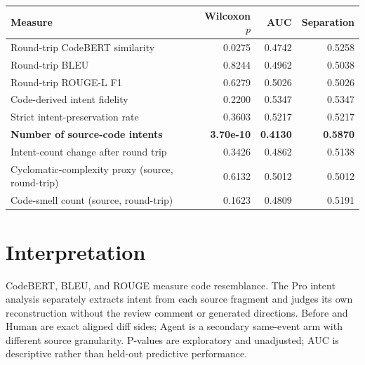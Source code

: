 \documentclass[11pt]{article}
\begin{document}
\begin{longtable}{p{8.5cm}rrr}
\toprule
Measure & Wilcoxon $p$ & AUC & Separation \\
\midrule
Round-trip CodeBERT similarity & 0.0275 & 0.4742 & 0.5258 \\
Round-trip BLEU & 0.8244 & 0.4962 & 0.5038 \\
Round-trip ROUGE-L F1 & 0.6279 & 0.5026 & 0.5026 \\
Code-derived intent fidelity & 0.2200 & 0.5347 & 0.5347 \\
Strict intent-preservation rate & 0.3603 & 0.5217 & 0.5217 \\
\textbf{Number of source-code intents} & \textbf{3.70e-10} & \textbf{0.4130} & \textbf{0.5870} \\
Intent-count change after round trip & 0.3426 & 0.4862 & 0.5138 \\
Cyclomatic-complexity proxy (source, round-trip) & 0.6132 & 0.5012 & 0.5012 \\
Code-smell count (source, round-trip) & 0.1623 & 0.4809 & 0.5191 \\
\bottomrule
\end{longtable}

\section*{Interpretation}
CodeBERT, BLEU, and ROUGE measure code resemblance. The Pro intent analysis separately extracts intent from each source fragment and judges its own reconstruction without the review comment or generated directions. Before and Human are exact aligned diff sides; Agent is a secondary same-event arm with different source granularity. P-values are exploratory and unadjusted; AUC is descriptive rather than held-out predictive performance.
\end{document}
